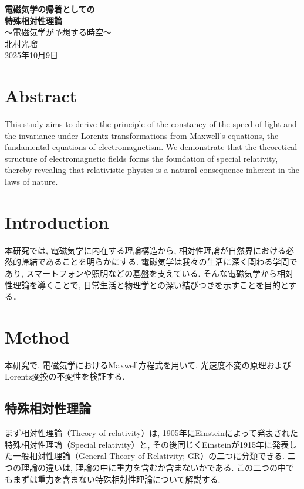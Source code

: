 \documentclass{ltjsarticle}
\begin{document}
\begin{titlepage}
    \centering
    \vspace*{3cm} %
    {\Huge \bfseries 電磁気学の帰着としての\\特殊相対性理論}\\[1.5cm] %
    {\Large ～電磁気学が予想する時空～}\\[1cm]
    {\large 北村光瑠}\\[5cm]
    {\large 2025年10月9日}
    \vfill %
\end{titlepage}



\section{Abstract}
This study aims to derive the principle of the constancy of the speed of light and the invariance 
under Lorentz transformations from Maxwell's equations, the fundamental equations of electromagnetism. 
We demonstrate that the theoretical structure of electromagnetic fields forms the foundation of special relativity, 
thereby revealing that relativistic physics is a natural consequence inherent in the laws of nature.

\section{Introduction}
本研究では, 電磁気学に内在する理論構造から, 相対性理論が自然界における必然的帰結であることを明らかにする. 
電磁気学は我々の生活に深く関わる学問であり, スマートフォンや照明などの基盤を支えている.
そんな電磁気学から相対性理論を導くことで, 日常生活と物理学との深い結びつきを示すことを目的とする．

\section{Method}
本研究で, 電磁気学におけるMaxwell方程式を用いて, 光速度不変の原理およびLorentz変換の不変性を検証する. 
\subsection{特殊相対性理論}
まず相対性理論（Theory of relativity）は, 1905年にEinsteinによって発表された特殊相対性理論（Special relativity）と, 
その後同じくEinsteinが1915年に発表した一般相対性理論（General Theory of Relativity; GR）の二つに分類できる. 
二つの理論の違いは, 理論の中に重力を含むか含まないかである. 
この二つの中でもまずは重力を含まない特殊相対性理論について解説する. 
\end{document}
